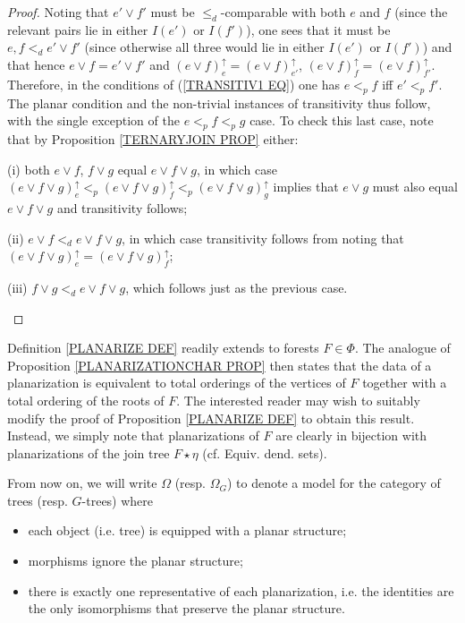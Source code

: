 \documentclass[a4paper,10pt]{article}%
\begin{document}
\begin{proof}
Noting that $e' \vee f'$ must be $\leq_d$-comparable with both $e$ and $f$ (since the relevant pairs lie in either $I(e')$ or $I(f')$), one sees that it must be $e,f <_d  e' \vee f'$ (since otherwise all three would lie in either $I(e')$ or $I(f')$) and that hence
$e \vee f = e' \vee f'$ and 
$(e \vee f)^{\uparrow}_e=(e \vee f)^{\uparrow}_{e'}$, 
$(e \vee f)^{\uparrow}_f=(e \vee f)^{\uparrow}_{f'}$. 
Therefore, in the conditions of (\ref{TRANSITIV1 EQ}) one has 
$e <_p f$ iff $e'<_p f'$. The planar condition and the non-trivial instances of transitivity thus follow, with the single exception of the $e <_p f <_p g$ case. 
To check this last case, note that by Proposition \ref{TERNARYJOIN PROP} either:
\begin{inparaenum}
	\item[(i)] both  
$e \vee f$, $f \vee g$ equal $e \vee f \vee g$, in which case  
 $(e \vee f \vee g)^{\uparrow}_e <_p
(e \vee f \vee g)^{\uparrow}_f <_p
(e \vee f \vee g)^{\uparrow}_g 
 $ 
implies that $e \vee g$ must also equal $e \vee f \vee g$ and transitivity follows;
	\item[(ii)] $e \vee f <_d e \vee f \vee g$, in which case 
	transitivity follows from noting that 
	$(e \vee f \vee g)^{\uparrow}_e = (e \vee f \vee g)^{\uparrow}_f$;
	\item[(iii)] $f \vee g <_d e \vee f \vee g$, which follows just as the previous case.
\end{inparaenum}
\end{proof}

\begin{remark}
	Definition \ref{PLANARIZE DEF} readily extends to forests $F \in \Phi$. The analogue of Proposition \ref{PLANARIZATIONCHAR PROP} then states that the data of a planarization is equivalent to total orderings of the vertices of $F$ together with a total ordering of the roots of $F$. The interested reader may wish to suitably modify the proof of Proposition \ref{PLANARIZE DEF} to obtain this result. Instead, we simply note that planarizations of $F$ are clearly in bijection with planarizations of the join tree $F \star \eta$ (cf. {\color{green} Equiv. dend. sets}).
\end{remark}


\begin{convention}\label{PLANARCONV CON}
	From now on, we will write $\Omega$ (resp. $\Omega_G$) to denote a model for the category of trees (resp. $G$-trees) where
\begin{itemize}	
	\item each object (i.e. tree) is equipped with a planar structure;
	\item morphisms ignore the planar structure;
	\item there is exactly one representative of each planarization, i.e. the identities are the only isomorphisms that preserve the planar structure.
\end{itemize}
\end{convention}
\end{document}
